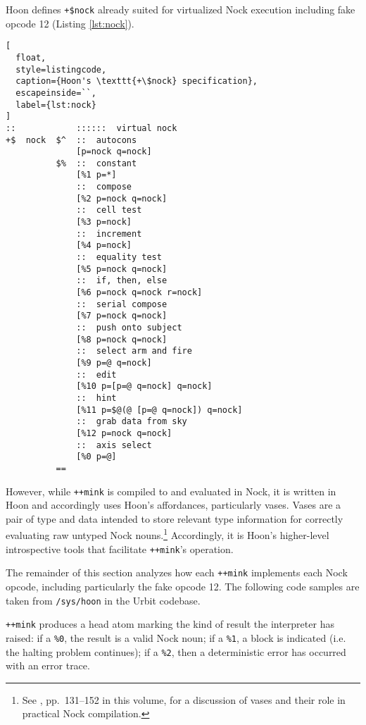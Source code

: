 \documentclass[twoside]{article}
\begin{document}
Hoon defines \lstinline[style=inlinecode]{+$nock} already suited for virtualized Nock execution including fake opcode 12 (Listing \ref{lst:nock}).

\begin{lstlisting}[
  float,
  style=listingcode,
  caption={Hoon's \texttt{+\$nock} specification},
  escapeinside=``,
  label={lst:nock}
]
::            ::::::  virtual nock
+$  nock  $^  ::  autocons
              [p=nock q=nock]
          $%  ::  constant
              [%1 p=*]
              ::  compose
              [%2 p=nock q=nock]
              ::  cell test
              [%3 p=nock]
              ::  increment
              [%4 p=nock]
              ::  equality test
              [%5 p=nock q=nock]
              ::  if, then, else
              [%6 p=nock q=nock r=nock]
              ::  serial compose
              [%7 p=nock q=nock]
              ::  push onto subject
              [%8 p=nock q=nock]
              ::  select arm and fire
              [%9 p=@ q=nock]
              ::  edit
              [%10 p=[p=@ q=nock] q=nock]
              ::  hint
              [%11 p=$@(@ [p=@ q=nock]) q=nock]
              ::  grab data from sky
              [%12 p=nock q=nock]
              ::  axis select
              [%0 p=@]
          ==
\end{lstlisting}

However, while \lstinline[style=inlinecode]{++mink} is compiled to and evaluated in Nock, it is written in Hoon and accordingly uses Hoon's affordances, particularly vases.  Vases are a pair of type and data intended to store relevant type information for correctly evaluating raw untyped Nock nouns.\footnote{See , pp.~131–152 in this volume, for a discussion of vases and their role in practical Nock compilation.}  Accordingly, it is Hoon's higher-level introspective tools that facilitate \lstinline[style=inlinecode]{++mink}'s operation.

\sloppy
The remainder of this section analyzes how each \lstinline[style=inlinecode]{++mink} implements each Nock opcode, including particularly the fake opcode 12.  The following code samples are taken from \lstinline[style=inlinecode]{/sys/hoon} in the Urbit codebase.

\lstinline[style=inlinecode]{++mink} produces a head atom marking the kind of result the interpreter has raised:  if a \lstinline[style=inlinecode]{%0}, the result is a valid Nock noun; if a \lstinline[style=inlinecode]{%1}, a block is indicated (i.e. the halting problem continues); if a \lstinline[style=inlinecode]{%2}, then a deterministic error has occurred with an error trace.
\end{document}
